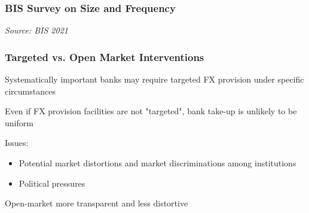 \documentclass{beamer}
\newenvironment{wideitemize}{\itemize\addtolength{\itemsep}{10pt}}{\enditemize}
\begin{document}
\begin{frame}
  \frametitle{BIS Survey on Size and Frequency}
  \medskip
  \emph{Source: BIS 2021 \href{https://www.bis.org/publ/mc_insights_fxinterventions.pdf}{}}
\end{frame}

\begin{frame}
  \frametitle{Targeted vs. Open Market Interventions}
  \begin{wideitemize}
    \item Systematically important banks may require targeted FX provision under specific circumstances
    \item Even if FX provision facilities are not "targeted", bank take-up is unlikely to be uniform
    \item Issues:
      \begin{itemize}
      \item Potential market distortions and market discriminations among institutions
      \item Political pressures
      \end{itemize}
  \item Open-market more transparent and less distortive
  \end{wideitemize}
\end{frame}
\end{document}

